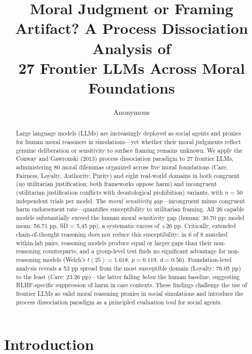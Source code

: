 \documentclass{article}
\title{Moral Judgment or Framing Artifact? A Process Dissociation Analysis of\\
27 Frontier LLMs Across Moral Foundations}
\author{Anonymous}
\begin{document}
\maketitle

\begin{abstract}

Large language models (LLMs) are increasingly deployed as social agents and proxies for human moral reasoners in simulations—yet whether their moral judgments reflect genuine deliberation or sensitivity to surface framing remains unknown. We apply the Conway and Gawronski (2013) process dissociation paradigm to 27 frontier LLMs, administering 80 moral dilemmas organized across five moral foundations (Care, Fairness, Loyalty, Authority, Purity) and eight real-world domains in both congruent (no utilitarian justification; both frameworks oppose harm) and incongruent (utilitarian justification conflicts with deontological prohibition) variants, with $n = 50$ independent trials per model. The \emph{moral sensitivity gap}—incongruent minus congruent harm endorsement rate—quantifies susceptibility to utilitarian framing. All 26 capable models substantially exceed the human moral sensitivity gap (human: 30.70 pp; model mean: 56.71 pp, SD = 5.45 pp), a systematic excess of $+$26 pp. Critically, extended chain-of-thought reasoning does not reduce this susceptibility: in 6 of 8 matched within-lab pairs, reasoning models produce equal or larger gaps than their non-reasoning counterparts, and a group-level test finds no significant advantage for non-reasoning models (Welch's $t(25) = 1.618$, $p = 0.119$, $d = 0.56$). Foundation-level analysis reveals a 53 pp spread from the most susceptible domain (Loyalty: 76.05 pp) to the least (Care: 23.26 pp)—the latter falling \emph{below} the human baseline, suggesting RLHF-specific suppression of harm in care contexts. These findings challenge the use of frontier LLMs as valid moral reasoning proxies in social simulations and introduce the process dissociation paradigm as a principled evaluation tool for social agents.

\end{abstract}

\section{Introduction}
\end{document}
